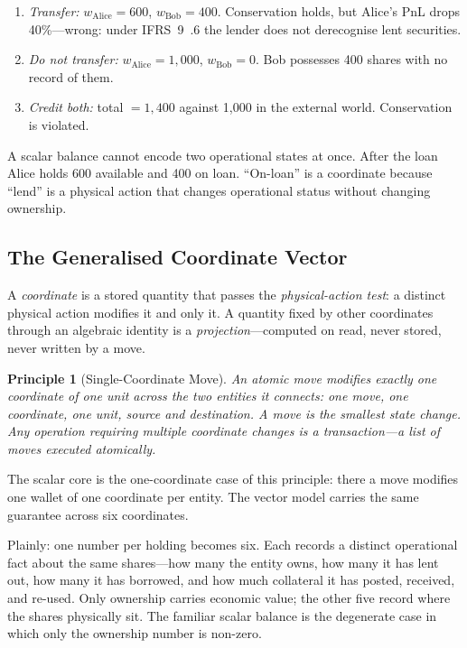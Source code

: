 \documentclass[11pt,a4paper]{article}
\newtheorem{principle}[definition]{Principle}
\begin{document}
\begin{enumerate}[nosep]
\item \emph{Transfer:} $w_{\mathrm{Alice}} = 600$, $w_{\mathrm{Bob}} = 400$. Conservation holds, but Alice's PnL drops 40\%---wrong: under IFRS~9~.6 the lender does not derecognise lent securities.
\item \emph{Do not transfer:} $w_{\mathrm{Alice}} = 1{,}000$, $w_{\mathrm{Bob}} = 0$. Bob possesses 400 shares with no record of them.
\item \emph{Credit both:} total $= 1{,}400$ against 1{,}000 in the external world. Conservation is violated.
\end{enumerate}

A scalar balance cannot encode two operational states at once. After the loan Alice holds 600 available and 400 on loan. ``On-loan'' is a coordinate because ``lend'' is a physical action that changes operational status without changing ownership.

\subsection{The Generalised Coordinate Vector}
\label{sec:position-vector}

A \emph{coordinate} is a stored quantity that passes the \emph{physical-action test}: a distinct physical action modifies it and only it. A quantity fixed by other coordinates through an algebraic identity is a \emph{projection}---computed on read, never stored, never written by a move.

\begin{principle}[Single-Coordinate Move]
\label{princ:single-coord}
An atomic move modifies exactly one coordinate of one unit across the two entities it connects: one move, one coordinate, one unit, source and destination. A move is the smallest state change. Any operation requiring multiple coordinate changes is a \emph{transaction}---a list of moves executed atomically.
\end{principle}

The scalar core is the one-coordinate case of this principle: there a move modifies one wallet of one coordinate per entity. The vector model carries the same guarantee across six coordinates.

Plainly: one number per holding becomes six. Each records a distinct operational fact about the same shares---how many the entity owns, how many it has lent out, how many it has borrowed, and how much collateral it has posted, received, and re-used. Only ownership carries economic value; the other five record where the shares physically sit. The familiar scalar balance is the degenerate case in which only the ownership number is non-zero.
\end{document}
